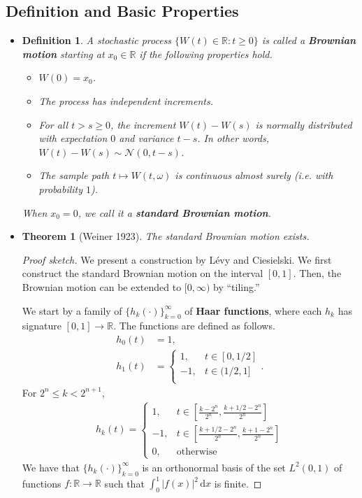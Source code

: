 \documentclass[10pt]{article}
\newtheorem{theorem}[lemma]{Theorem}
\newtheorem{definition}[lemma]{Definition}
\newcommand{\dee}{\mathrm{d}}
\newcommand{\mcal}[1]{\mathcal{#1}}
\newcommand{\Real}{\mathbb{R}}
\begin{document}
\subsection{Definition and Basic Properties}
\begin{itemize}
  \item \begin{definition} \label{def:brownian-motion}
    A stochastic process $\{W(t) \in \Real : t \geq 0\}$ is called a {\bf Brownian motion} starting at $x_0 \in \Real$ if the following properties hold.
    \begin{itemize}
      \item[(1)] $W(0) = x_0$.
      \item[(2)] The process has independent increments.
      \item[(3)] For all $t > s \geq 0$, the increment $W(t) - W(s)$ is normally distributed with expectation $0$ and variance $t-s$. In other words, $W(t) - W(s) \sim \mcal{N}(0, t-s)$.
      \item[(4)] The sample path $t \mapsto W(t,\omega)$ is continuous almost surely (i.e. with probability $1$).
    \end{itemize}
    When $x_0 = 0$, we call it a {\bf standard Brownian motion}.    
  \end{definition}

  \item \begin{theorem}[Weiner 1923]
    The standard Brownian motion exists.
  \end{theorem}

  \begin{proof}[Proof sketch]
    We present a construction by L\'{e}vy and Ciesielski. We first construct the standard Brownian motion on the interval $[0,1]$. Then, the Brownian motion can be extended to $[0,\infty)$ by ``tiling.''

    We start by a family of $\{ h_k(\cdot) \}_{k=0}^\infty$ of {\bf Haar functions}, where each $h_k$ has signature $[0,1] \rightarrow \Real$. The functions are defined as follows.
    \begin{align*}
      h_0(t) &= 1, \\
      h_1(t) &= \begin{cases}
        1, & t \in [0,1/2] \\
        -1, & t \in (1/2,1] \\
      \end{cases}.
    \end{align*}
    For $2^n \leq k < 2^{n+1}$, 
    \begin{align*}
      h_k(t) = \begin{cases}
        1, & t \in [\frac{k-2^n}{2^n}, \frac{k+1/2-2^n}{2^n}]\\
        -1, & t \in [\frac{k+1/2-2^n}{2^n}, \frac{k+1-2^n}{2^n}]\\
        0, & \mbox{otherwise}
      \end{cases}
    \end{align*}
    We have that $\{ h_k(\cdot) \}_{k=0}^\infty$ is an orthonormal basis of the set $L^2(0,1)$ of functions $f: \Real \rightarrow \Real$ such that $\int_0^1 |f(x)|^2 \, \dee x$ is finite.


\end{proof}
\end{itemize}
\end{document}
